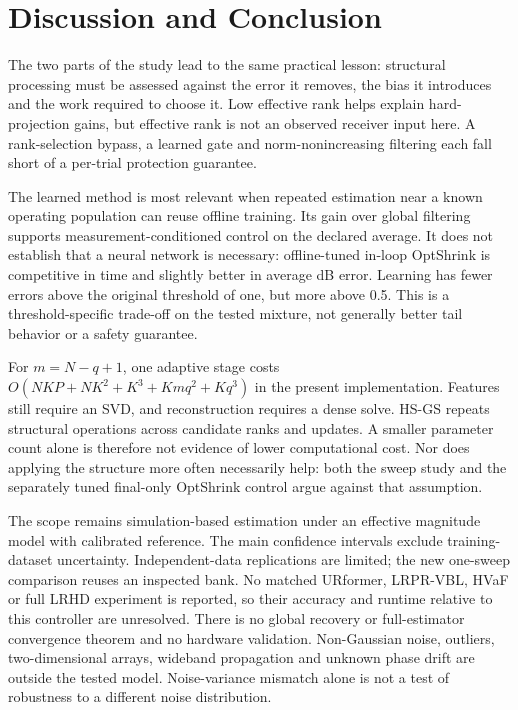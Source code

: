 \documentclass[10pt,journal,letterpaper]{IEEEtran}
\begin{document}
\section{Discussion and Conclusion}
The two parts of the study lead to the same practical lesson: structural processing must be assessed against the error it removes, the bias it introduces and the work required to choose it. Low effective rank helps explain hard-projection gains, but effective rank is not an observed receiver input here. A rank-selection bypass, a learned gate and norm-nonincreasing filtering each fall short of a per-trial protection guarantee.

The learned method is most relevant when repeated estimation near a known operating population can reuse offline training. Its gain over global filtering supports measurement-conditioned control on the declared average. It does not establish that a neural network is necessary: offline-tuned in-loop OptShrink is competitive in time and slightly better in average dB error. Learning has fewer errors above the original threshold of one, but more above 0.5. This is a threshold-specific trade-off on the tested mixture, not generally better tail behavior or a safety guarantee.

For $m=N-q+1$, one adaptive stage costs $O(NKP+NK^2+K^3+Kmq^2+Kq^3)$ in the present implementation. Features still require an SVD, and reconstruction requires a dense solve. HS-GS repeats structural operations across candidate ranks and updates. A smaller parameter count alone is therefore not evidence of lower computational cost. Nor does applying the structure more often necessarily help: both the sweep study and the separately tuned final-only OptShrink control argue against that assumption.

The scope remains simulation-based estimation under an effective magnitude model with calibrated reference. The main confidence intervals exclude training-dataset uncertainty. Independent-data replications are limited; the new one-sweep comparison reuses an inspected bank. No matched URformer, LRPR-VBL, HVaF or full LRHD experiment is reported, so their accuracy and runtime relative to this controller are unresolved. There is no global recovery or full-estimator convergence theorem and no hardware validation. Non-Gaussian noise, outliers, two-dimensional arrays, wideband propagation and unknown phase drift are outside the tested model. Noise-variance mismatch alone is not a test of robustness to a different noise distribution.
\end{document}

